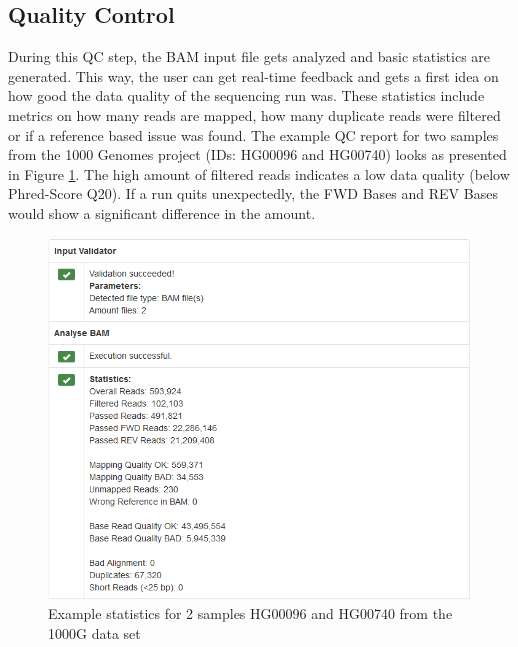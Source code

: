 \subsection{Quality Control}
During this QC step, the BAM input file gets analyzed and basic statistics are generated. This way, the user can get real-time feedback and gets a first idea on how good the data quality of the sequencing run was. These statistics include metrics on how many reads are mapped, how many duplicate reads were filtered or if a reference based issue was found. The example QC report for two samples from the 1000 Genomes project (IDs: HG00096 and HG00740) looks as presented in Figure \ref{fig:mtdna-server-qc}. The high amount of filtered reads indicates a low data quality (below Phred-Score Q20). If a run quits unexpectedly, the FWD Bases and REV Bases would show a significant difference in the amount.  
\begin{figure}[!ht]
    \centering
    \includegraphics[width=1\textwidth]{images/mtdna-server-qc.png}
    \caption[Example statistics for 2 samples from 1000G]{Example statistics for 2 samples HG00096 and HG00740 from the 1000G data set}
    \label{fig:mtdna-server-qc}
\end{figure}
